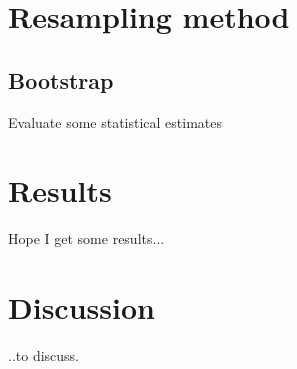 \documentclass[a4paper,12pt, english]{article}
\begin{document}
\section*{Resampling method}



\subsection*{Bootstrap}

Evaluate some statistical estimates

\section*{Results}

Hope I get some results...

\section*{Discussion}

..to discuss. 
\end{document}
